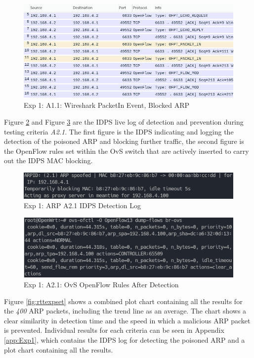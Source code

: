\documentclass[12pt, oneside]{book}
\begin{document}
\begin{figure}[H]
	\centering
	\includegraphics[scale=0.49]{../tests/a11/packetinNoArp.png}
	\caption{Exp 1: A1.1: Wireshark PacketIn Event, Blocked ARP}
	\label{fig:a13detected}
\end{figure}

\newpage
Figure \ref{fig:arpa21l} and Figure \ref{fig:a21detected} are the IDPS live log of detection and prevention during testing 
criteria \emph{A2.1}. The first figure is the IDPS indicating and logging the detection of the poisoned ARP and blocking 
further traffic, the second figure is the OpenFlow rules set within the OvS switch that are actively inserted to carry out
the IDPS MAC blocking.
\begin{figure}[H]
	\centering
	\includegraphics[scale=0.7]{../tests/a21/IDPSCap.png}
	\caption{Exp 1: ARP A2.1 IDPS Detection Log}
	\label{fig:arpa21l}
\end{figure}

\begin{figure}[H]
	\centering
	\includegraphics[scale=0.65]{../tests/a11/dumpedrules.png}
	\caption{Exp 1: A2.1: OvS OpenFlow Rules After Detection}
	\label{fig:a21detected}
\end{figure}

Figure \ref{fig:rttexpset} shows a combined plot chart containing all the results for the \emph{400} ARP packets,
including the trend line as an average. The chart shows a clear similarity in detection time and the speed in which
a malicious ARP packet is prevented. Individual results for each criteria can be seen in Appendix \ref{app:Exp1}, which contains the IDPS log for detecting the 
poisoned ARP and a plot chart containing all the results.
\end{document}

